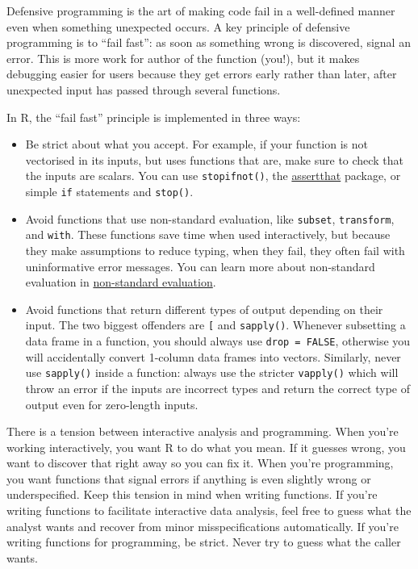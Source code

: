 Defensive programming is the art of making code fail in a well-defined
manner even when something unexpected occurs. A key principle of
defensive programming is to ``fail fast'': as soon as something wrong is
discovered, signal an error. This is more work for author of the
function (you!), but it makes debugging easier for users because they
get errors early rather than later, after unexpected input has passed
through several functions. 

In R, the ``fail fast'' principle is implemented in three ways:

\begin{itemize}
\item
  Be strict about what you accept. For example, if your function is not
  vectorised in its inputs, but uses functions that are, make sure to
  check that the inputs are scalars. You can use \texttt{stopifnot()},
  the \href{https://github.com/hadley/assertthat}{assertthat} package,
  or simple \texttt{if} statements and \texttt{stop()}.
\item
  Avoid functions that use non-standard evaluation, like
  \texttt{subset}, \texttt{transform}, and \texttt{with}. These
  functions save time when used interactively, but because they make
  assumptions to reduce typing, when they fail, they often fail with
  uninformative error messages. You can learn more about non-standard
  evaluation in \hyperref[nse]{non-standard evaluation}.
\item
  Avoid functions that return different types of output depending on
  their input. The two biggest offenders are \texttt{{[}} and
  \texttt{sapply()}. Whenever subsetting a data frame in a function, you
  should always use \texttt{drop = FALSE}, otherwise you will
  accidentally convert 1-column data frames into vectors. Similarly,
  never use \texttt{sapply()} inside a function: always use the stricter
  \texttt{vapply()} which will throw an error if the inputs are
  incorrect types and return the correct type of output even for
  zero-length inputs.
\end{itemize}

There is a tension between interactive analysis and programming. When
you're working interactively, you want R to do what you mean. If it
guesses wrong, you want to discover that right away so you can fix it.
When you're programming, you want functions that signal errors if
anything is even slightly wrong or underspecified. Keep this tension in
mind when writing functions. If you're writing functions to facilitate
interactive data analysis, feel free to guess what the analyst wants and
recover from minor misspecifications automatically. If you're writing
functions for programming, be strict. Never try to guess what the caller
wants.

